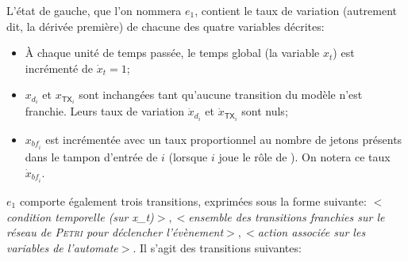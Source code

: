 L'état de gauche, que l'on nommera $e_1$, contient le taux de variation (autrement dit, la dérivée première) de chacune des quatre variables décrites:
\begin{itemize}
    \item À chaque unité de temps passée, le temps global (la variable $x_t$) est incrémenté de $\dot{x}_t=1$;
    \item $x_{d_i}$ et $x_{\mathsf{TX}_i}$ sont inchangées tant qu'aucune transition du modèle \rpsge n'est franchie.
        Leurs taux de variation $\dot{x}_{d_i}$ et $\dot{x}_{\mathsf{TX}_i}$ sont nuls;
    \item $x_{\mathit{bf}_i}$ est incrémentée avec un taux proportionnel au nombre de jetons présents dans le tampon d'entrée de $i$ (lorsque $i$ joue le rôle de \cn).
        On notera ce taux~$\dot{x}_{\mathit{bf}_i}$.
\end{itemize}
$e_1$ comporte également trois transitions, exprimées sous la forme suivante: $<$\textit{condition temporelle (sur x\_t)}$>, <$\textit{ensemble des transitions franchies sur le réseau de \textsc{Petri} pour déclencher l'évènement}$>, <$\textit{action associée sur les variables de l'automate}$>$.
Il s'agit des transitions suivantes:
